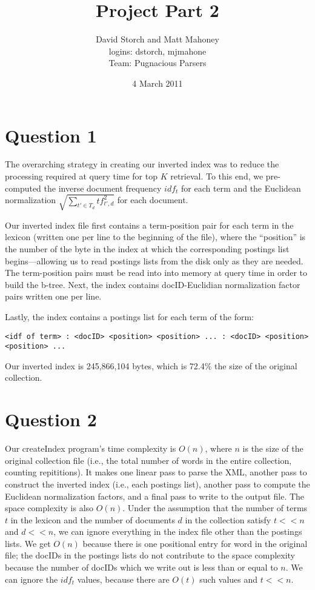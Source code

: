 \documentclass[11pt]{article}
\title{Project Part 2}
\author{David Storch and Matt Mahoney \\
	logins: dstorch, mjmahone \\
	Team: Pugnacious Parsers}
\date{4 March 2011}
\begin{document}
\maketitle

\section{Question 1}

The overarching strategy in creating our inverted index was to reduce the
processing required at query time for top $K$ retrieval. To this end, we pre-computed
the inverse document frequency $idf_{t}$ for each term and the Euclidean normalization $\sqrt{\sum_{t'\in T_{d}} tf^{2}_{t', d}}$ for each document.

Our inverted index file first contains a term-position pair
for each term in the lexicon (written one per line to the beginning of the file), where the ``position'' is the number of the byte in the index at which the
corresponding postings list begins---allowing us to read postings lists from the disk only as they
are needed. The term-position pairs must be read into into memory at query time in order to build the b-tree.
Next, the index contains docID-Euclidian normalization factor pairs written one per line.

Lastly, the index contains a postings list for each term of the form:
\begin{verbatim}
<idf of term> : <docID> <position> <position> ... : <docID> <position> <position> ...
\end{verbatim}

Our inverted index is 245,866,104 bytes, which is 72.4\% the size of the original collection.

\section{Question 2}

Our createIndex program's time complexity is $O(n)$, where $n$ is the size of the original collection file (i.e.,
the total number of words in the entire collection, counting repititions).
It makes one linear pass to parse the XML, another pass to construct the inverted index (i.e., each postings list), 
another pass to compute the Euclidean normalization factors, and a final pass to write to the output file. The space complexity
is also $O(n)$. Under the assumption that the number of terms $t$ in the lexicon and the number of documents
$d$ in the collection satisfy $t << n$ and $d << n$, we can ignore everything in the index file other than
the postings lists. We get $O(n)$ because there is one positional entry for word in the original file; the docIDs in the postings
lists do not contribute to the space complexity because the number of docIDs which we write out is less than or equal to $n$.
We can ignore the $idf_{t}$ values, because there are $O(t)$ such values and $t << n$.
\end{document}
